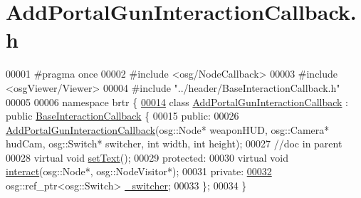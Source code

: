 \hypertarget{_add_portal_gun_interaction_callback_8h_source}{\section{Add\+Portal\+Gun\+Interaction\+Callback.\+h}
\label{_add_portal_gun_interaction_callback_8h_source}
}

\begin{DoxyCode}
00001 \textcolor{preprocessor}{#pragma once}
00002 \textcolor{preprocessor}{#include <osg/NodeCallback>}
00003 \textcolor{preprocessor}{#include <osgViewer/Viewer>}
00004 \textcolor{preprocessor}{#include "../header/BaseInteractionCallback.h"}
00005 
00006 \textcolor{keyword}{namespace }brtr \{
\hypertarget{_add_portal_gun_interaction_callback_8h_source_l00014}{}\hyperlink{classbrtr_1_1_add_portal_gun_interaction_callback}{00014}     \textcolor{keyword}{class }\hyperlink{classbrtr_1_1_add_portal_gun_interaction_callback}{AddPortalGunInteractionCallback} : \textcolor{keyword}{public} 
      \hyperlink{classbrtr_1_1_base_interaction_callback}{BaseInteractionCallback} \{
00015     \textcolor{keyword}{public}:
00026         \hyperlink{classbrtr_1_1_add_portal_gun_interaction_callback_a849f25b53c2a3c81e8201777bf481c96}{AddPortalGunInteractionCallback}(osg::Node* weaponHUD, osg::Camera* 
      hudCam, osg::Switch* switcher, \textcolor{keywordtype}{int} width, \textcolor{keywordtype}{int} height);
00027         \textcolor{comment}{//doc in parent}
00028         \textcolor{keyword}{virtual} \textcolor{keywordtype}{void} \hyperlink{classbrtr_1_1_add_portal_gun_interaction_callback_aa0db50622c7ae1cd25f8554c916137db}{setText}();
00029     \textcolor{keyword}{protected}:
00030         \textcolor{keyword}{virtual} \textcolor{keywordtype}{void} \hyperlink{classbrtr_1_1_add_portal_gun_interaction_callback_a9b6571b0295f7e12425b57ff0262dbd4}{interact}(osg::Node*, osg::NodeVisitor*);
00031     \textcolor{keyword}{private}:
\hypertarget{_add_portal_gun_interaction_callback_8h_source_l00032}{}\hyperlink{classbrtr_1_1_add_portal_gun_interaction_callback_ac110a98cbe720e599b344d9940702597}{00032}         osg::ref\_ptr<osg::Switch> \hyperlink{classbrtr_1_1_add_portal_gun_interaction_callback_ac110a98cbe720e599b344d9940702597}{\_switcher};
00033     \};
00034 \}
\end{DoxyCode}
